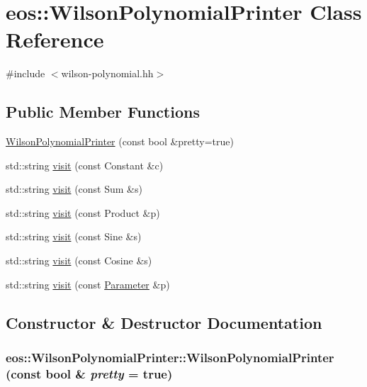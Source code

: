 \hypertarget{classeos_1_1WilsonPolynomialPrinter}{
\section{eos::WilsonPolynomialPrinter Class Reference}
\label{classeos_1_1WilsonPolynomialPrinter}
}


{\ttfamily \#include $<$wilson-\/polynomial.hh$>$}\subsection*{Public Member Functions}
\begin{DoxyCompactItemize}
\item 
\hyperlink{classeos_1_1WilsonPolynomialPrinter_a790ebda04554560c04b6004384a4cda6}{WilsonPolynomialPrinter} (const bool \&pretty=true)
\item 
std::string \hyperlink{classeos_1_1WilsonPolynomialPrinter_a16734adc9f8e5ed38f98dec2fe7f1082}{visit} (const Constant \&c)
\item 
std::string \hyperlink{classeos_1_1WilsonPolynomialPrinter_a203b4d50f4295a05bf382238bf2fa0cc}{visit} (const Sum \&s)
\item 
std::string \hyperlink{classeos_1_1WilsonPolynomialPrinter_af1f56261d6e1fe1e9b78cf1f6f1c0555}{visit} (const Product \&p)
\item 
std::string \hyperlink{classeos_1_1WilsonPolynomialPrinter_a002e08bd6d795359f62df48e2439e978}{visit} (const Sine \&s)
\item 
std::string \hyperlink{classeos_1_1WilsonPolynomialPrinter_a498347291642740249609a62270c4d81}{visit} (const Cosine \&s)
\item 
std::string \hyperlink{classeos_1_1WilsonPolynomialPrinter_a9ea1405c94483cec63167db42823321b}{visit} (const \hyperlink{classeos_1_1Parameter}{Parameter} \&p)
\end{DoxyCompactItemize}


\subsection{Constructor \& Destructor Documentation}
\hypertarget{classeos_1_1WilsonPolynomialPrinter_a790ebda04554560c04b6004384a4cda6}{
\subsubsection[{WilsonPolynomialPrinter}]{\setlength{\rightskip}{0pt plus 5cm}eos::WilsonPolynomialPrinter::WilsonPolynomialPrinter (const bool \& {\em pretty} = {\ttfamily true})}}
\label{classeos_1_1WilsonPolynomialPrinter_a790ebda04554560c04b6004384a4cda6}


